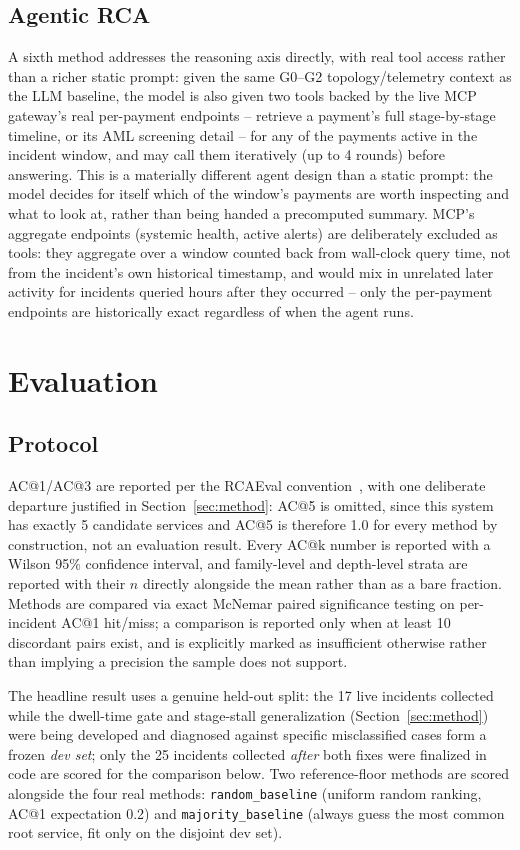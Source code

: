 \documentclass[conference]{IEEEtran}
\begin{document}
\subsection{Agentic RCA}
A sixth method addresses the reasoning axis directly, with real
tool access rather than a richer static prompt: given the same G0--G2
topology/telemetry context as the LLM baseline, the model is also given
two tools backed by the live MCP gateway's real per-payment endpoints --
retrieve a payment's full stage-by-stage timeline, or its AML screening
detail -- for any of the payments active in the incident window, and may
call them iteratively (up to 4 rounds) before answering. This is a
materially different agent design than a static prompt: the model decides
for itself which of the window's payments are worth inspecting and what
to look at, rather than being handed a precomputed summary. MCP's
aggregate endpoints (systemic health, active alerts) are deliberately
excluded as tools: they aggregate over a window counted back from
wall-clock query time, not from the incident's own historical timestamp,
and would mix in unrelated later activity for incidents queried hours
after they occurred -- only the per-payment endpoints are historically
exact regardless of when the agent runs.

\section{Evaluation}
\label{sec:eval}

\subsection{Protocol}
AC@1/AC@3 are reported per the RCAEval convention~\cite{rcaeval2024}, with
one deliberate departure justified in Section~\ref{sec:method}: AC@5 is
omitted, since this system has exactly 5 candidate services and AC@5 is
therefore 1.0 for every method by construction, not an evaluation result.
Every AC@k number is reported with a Wilson 95\% confidence interval, and
family-level and depth-level strata are reported with their $n$ directly
alongside the mean rather than as a bare fraction. Methods are compared
via exact McNemar paired significance testing on per-incident AC@1
hit/miss; a comparison is reported only when at least 10 discordant pairs
exist, and is explicitly marked as insufficient otherwise rather than
implying a precision the sample does not support.

The headline result uses a genuine held-out split: the 17 live incidents
collected while the dwell-time gate and stage-stall generalization
(Section~\ref{sec:method}) were being developed and diagnosed against
specific misclassified cases form a frozen \emph{dev set}; only the 25
incidents collected \emph{after} both fixes were finalized in code are
scored for the comparison below. Two reference-floor methods are scored
alongside the four real methods: \texttt{random\_baseline} (uniform random
ranking, AC@1 expectation 0.2) and \texttt{majority\_baseline} (always
guess the most common root service, fit only on the disjoint dev set).
\end{document}
